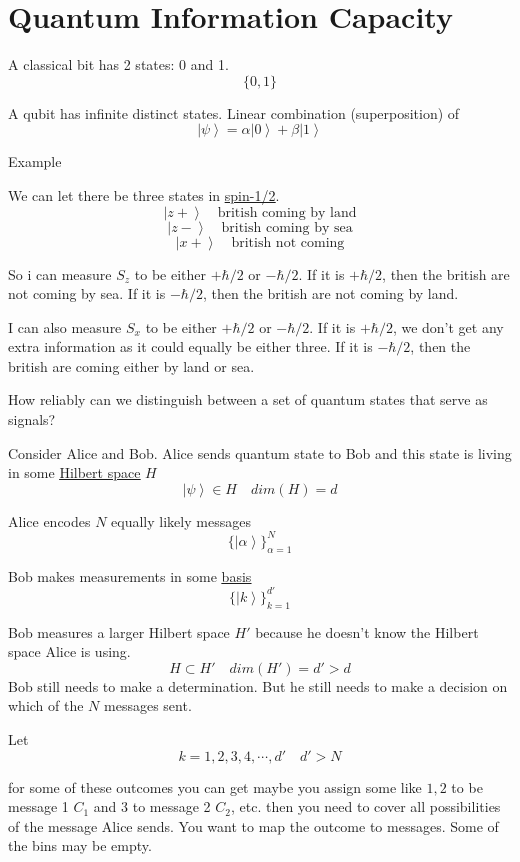 \documentclass[
]{article}
\let\oldhyperref\hyperref
\renewcommand{\hyperref}[2][]{\oldhyperref[#1]{\underline{#2}}}
\providecommand{\ket}[1]{\left\lvert #1 \right\rangle}
\begin{document}
\section{Quantum Information Capacity}\label{quantum-information-capacity}

A classical bit has 2 states: 0 and 1.
\[
	\{0,1\}
\]

A qubit has infinite distinct states. Linear combination (superposition) of
\[
	\ket{\psi} = \alpha\ket{0} + \beta\ket{1}
\]

Example

We can let there be three states in \hyperref[quantum-system]{spin-1/2}.
\[
	\ket{z+}\quad\text{british coming by land}
\]
\[
	\ket{z-}\quad\text{british coming by sea}
\]
\[
	\ket{x+}\quad\text{british not coming}
\]

So i can measure \(S_z\) to be either \(+\hbar/2\) or \(-\hbar/2\).
If it is \(+\hbar/2\), then the british are not coming by sea. If it is \(-\hbar/2\), then the british are not coming by land.

I can also measure \(S_x\) to be either \(+\hbar/2\) or \(-\hbar/2\).
If it is \(+\hbar/2\), we don't get any extra information as it could equally be either three. If it is \(-\hbar/2\), then the british are coming either by land or sea.

How reliably can we distinguish between a set of quantum states that serve as signals?

Consider Alice and Bob. Alice sends quantum state to Bob and this state is living in some \hyperref[hilbert-spaces]{Hilbert space} \(H\)
\[
	\ket{\psi}\in H\quad dim(H)=d
\]

Alice encodes \(N\) equally likely messages
\[
	\{\ket{\alpha}\}_{\alpha=1}^N
\]

Bob makes measurements in some \hyperref[basis-states]{basis}
\[
	\{\ket{k}\}_{k=1}^{d'}
\]

Bob measures a larger Hilbert space \(H'\) because he doesn't know the Hilbert space Alice is using.
\[
	H\subset H'\quad dim(H')=d'>d
\]
Bob still needs to make a determination. But he still needs to make a decision on which of the \(N\) messages sent.

Let
\[
	k=1,2,3,4,\cdots,d'\quad d'>N
\]

for some of these outcomes you can get maybe you assign some like $1,2$ to be message 1 $C_1$ and $3$ to message 2 $C_2$, etc. then you need to cover all possibilities of the message Alice sends. You want to map the outcome to messages. Some of the bins may be empty.
\end{document}
